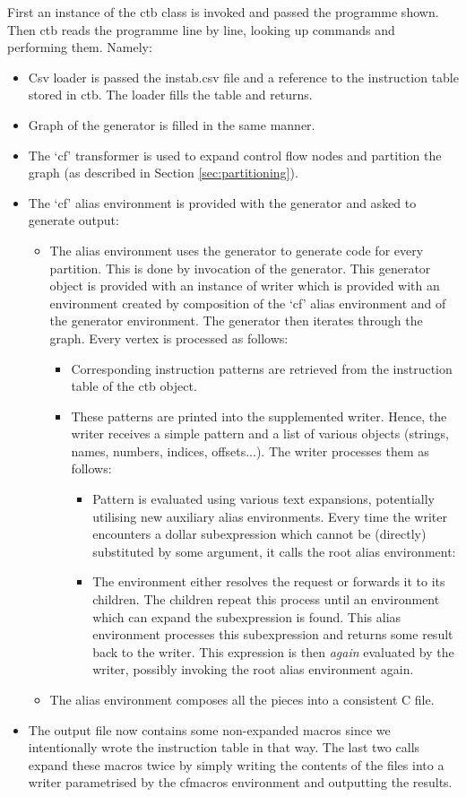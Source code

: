 First an instance of the ctb class is invoked and passed the programme shown. Then ctb reads the programme line by line, looking up commands and performing them. Namely:
\begin{itemize}
  \item Csv loader is passed the instab.csv file and a reference to the instruction table stored in ctb. The loader fills the table and returns.
  \item Graph of the generator is filled in the same manner.
  \item The `cf' transformer is used to expand control flow nodes and partition the graph (as described in Section \ref{sec:partitioning}).
  \item The `cf' alias environment is provided with the generator and asked to generate output:
  \begin{itemize}
    \item The alias environment uses the generator to generate code for every partition. This is done by invocation of the generator. This generator object is provided with an instance of writer which is provided with an environment created by composition of the `cf' alias environment and of the generator environment. The generator then iterates through the graph. Every vertex is processed as follows:
    \begin{itemize}
      \item Corresponding instruction patterns are retrieved from the instruction table of the ctb object.
      \item These patterns are printed into the supplemented writer. Hence, the writer receives a simple pattern and a list of various objects (strings, names, numbers, indices, offsets...). The writer processes them as follows:
        \begin{itemize}
          \item Pattern is evaluated using various text expansions, potentially utilising new auxiliary alias environments. Every time the writer encounters a dollar subexpression which cannot be (directly) substituted by some argument, it calls the root alias environment:
          \item The environment either resolves the request or forwards it to its children. The children repeat this process until an environment which can expand the subexpression is found. This alias environment processes this subexpression and returns some result back to the writer. This expression is then \emph{again} evaluated by the writer, possibly invoking the root alias environment again.
        \end{itemize}
    \end{itemize}
    \item The alias environment composes all the pieces into a consistent C file.
  \end{itemize}
  \item The output file now contains some non-expanded macros since we intentionally wrote the instruction table in that way. The last two calls expand these macros twice by simply writing the contents of the files into a writer parametrised by the cfmacros environment and outputting the results.
\end{itemize}


